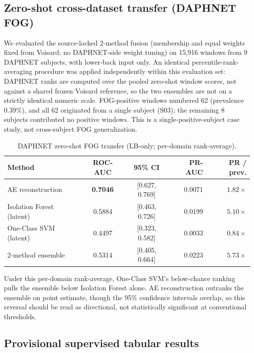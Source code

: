 \documentclass[11pt,a4paper]{article}
\begin{document}
\subsection{Zero-shot cross-dataset transfer (DAPHNET FOG)}

We evaluated the source-locked 2-method fusion (membership and equal weights fixed from Voisard; no DAPHNET-side weight tuning) on 15{,}916 windows from 9 DAPHNET subjects, with lower-back input only. An identical percentile-rank-averaging procedure was applied independently within this evaluation set: DAPHNET ranks are computed over the pooled zero-shot window scores, not against a shared frozen Voisard reference, so the two ensembles are not on a strictly identical numeric scale. FOG-positive windows numbered 62 (prevalence 0.39\%), and all 62 originated from a single subject (S03); the remaining 8 subjects contributed no positive windows. This is a single-positive-subject case study, not cross-subject FOG generalization.

\begin{table}[ht]
\centering
\caption{DAPHNET zero-shot FOG transfer (LB-only; per-domain rank-average).}
\label{tab:daphnet}
\begin{tabular}{lccrr}
\toprule
Method & ROC-AUC & 95\% CI & PR-AUC & PR / prev. \\
\midrule
AE reconstruction & \textbf{0.7046} & [0.627, 0.769] & 0.0071 & $1.82\times$ \\
Isolation Forest (latent) & 0.5884 & [0.463, 0.726] & 0.0199 & $5.10\times$ \\
One-Class SVM (latent) & 0.4497 & [0.323, 0.582] & 0.0033 & $0.84\times$ \\
2-method ensemble & 0.5314 & [0.405, 0.664] & 0.0223 & $5.73\times$ \\
\bottomrule
\end{tabular}
\end{table}

Under this per-domain rank-average, One-Class SVM's below-chance ranking pulls the ensemble below Isolation Forest alone. AE reconstruction outranks the ensemble on point estimate, though the 95\% confidence intervals overlap, so this reversal should be read as directional, not statistically significant at conventional thresholds.

\subsection{Provisional supervised tabular results}
\label{sec:res-tabular}
\end{document}
